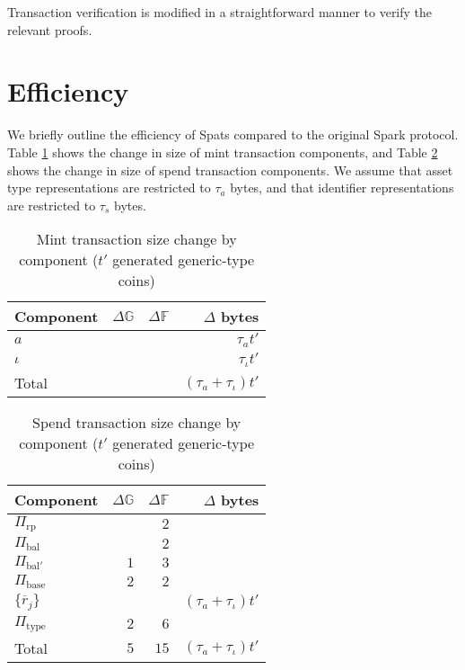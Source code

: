 \documentclass{article}
\newcommand{\G}{\mathbb{G}}
\newcommand{\F}{\mathbb{F}}
\begin{document}
Transaction verification is modified in a straightforward manner to verify the relevant proofs.


\section{Efficiency}

We briefly outline the efficiency of Spats compared to the original Spark protocol.
Table \ref{table:size_mint} shows the change in size of mint transaction components, and Table \ref{table:size_spend} shows the change in size of spend transaction components.
We assume that asset type representations are restricted to $\tau_a$ bytes, and that identifier representations are restricted to $\tau_s$ bytes.

\begin{table}[ht]
    \centering
    \begin{tabular}{|l|r|r|r|}
    \hline
    \textbf{Component} & \textbf{$\Delta\G$} & \textbf{$\Delta\F$} & \textbf{$\Delta$ bytes} \\
    \hline
    $a$ & &  & $\tau_a t'$ \\
    $\iota$ & &  & $\tau_\iota t'$ \\
    \hline
    Total & & & $(\tau_a + \tau_\iota) t'$ \\
    \hline
    \end{tabular}
    \caption{Mint transaction size change by component ($t'$ generated generic-type coins)}
    \label{table:size_mint}
\end{table}

\begin{table}[ht]
    \centering
    \begin{tabular}{|l|r|r|r|}
    \hline
    \textbf{Component} & \textbf{$\Delta\G$} & \textbf{$\Delta\F$} & \textbf{$\Delta$ bytes} \\
    \hline
    $\Pi_{\text{rp}}$ & & $2$ & \\
    $\Pi_{\text{bal}}$ & & $2$ & \\
    $\Pi_{\text{bal}'}$ & $1$ & $3$ & \\
    $\Pi_{\text{base}}$ & $2$ & $2$ & \\
    $\{\overline{r}_j\}$ & & & $(\tau_a + \tau_\iota) t'$ \\
    $\Pi_{\text{type}}$ & $2$ & $6$ & \\
    \hline
    Total & $5$ & $15$ & $(\tau_a + \tau_\iota) t'$ \\
    \hline
    \end{tabular}
    \caption{Spend transaction size change by component ($t'$ generated generic-type coins)}
    \label{table:size_spend}
\end{table}
\end{document}
